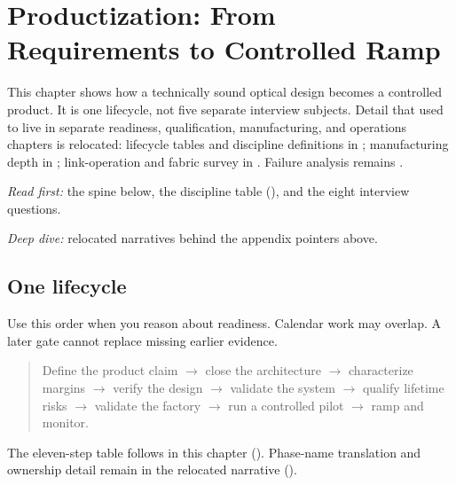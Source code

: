 \chapter{Productization: From Requirements to Controlled Ramp}
\label{ch:productization}
\label{ch:product-readiness}
\label{ch:validation}
\label{ch:reliability}
\label{ch:manufacturing}
\label{ch:networking}

This chapter shows how a technically sound optical design becomes a controlled
product. It is one lifecycle, not five separate interview subjects. Detail that
used to live in separate readiness, qualification, manufacturing, and
operations chapters is relocated: lifecycle tables and discipline definitions in
; manufacturing depth in
; link-operation and fabric survey in
. Failure analysis remains
.

\textit{Read first:} the spine below, the discipline table
(), and the eight interview questions.

\textit{Deep dive:} relocated narratives behind the appendix pointers above.


\section{One lifecycle}
\label{sec:productization-spine}

Use this order when you reason about readiness. Calendar work may overlap. A
later gate cannot replace missing earlier evidence.

\begin{quote}
\noindent Define the product claim
$\rightarrow$ close the architecture
$\rightarrow$ characterize margins
$\rightarrow$ verify the design
$\rightarrow$ validate the system
$\rightarrow$ qualify lifetime risks
$\rightarrow$ validate the factory
$\rightarrow$ run a controlled pilot
$\rightarrow$ ramp and monitor.
\end{quote}

The eleven-step table follows in this chapter
(). Phase-name translation and ownership
detail remain in the relocated narrative
().

